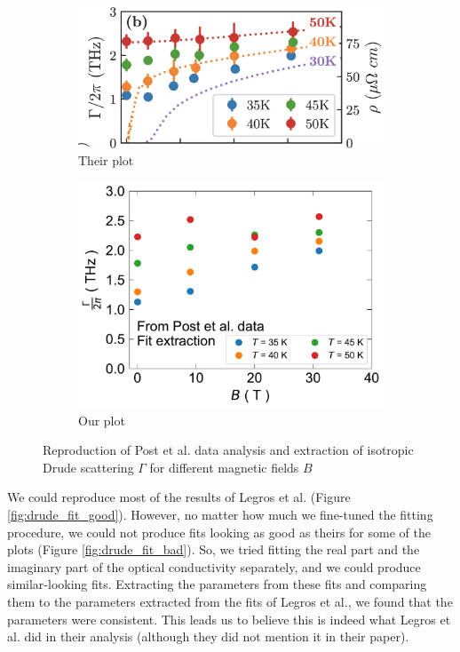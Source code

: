 \begin{figure}
\centering
\begin{subfigure}{0.45\textwidth}
    \includegraphics[width=\textwidth]{figures/gamma_theirs}
    \caption{Their plot}
    \label{fig:gamma_ours}
\end{subfigure}
\hfill
\begin{subfigure}{0.45\textwidth}
    \includegraphics[width=\textwidth]{figures/fitting_Drude_extracted_Gamma.pdf}
    \caption{Our plot}
    \label{fig:gamma_theirs}
\end{subfigure}
        
\caption{Reproduction of Post et al. data analysis and extraction of isotropic Drude scattering $\Gamma$ for different magnetic fields $B$}
\label{fig:reproduction_post}
\end{figure}

We could reproduce most of the results of Legros et al. (Figure \ref{fig:drude_fit_good}).
However, no matter how much we fine-tuned the fitting procedure, we could not produce fits looking
as good as theirs for some of the plots (Figure \ref{fig:drude_fit_bad}). So, we tried fitting the
real part and the imaginary part of the optical conductivity separately, and we could produce
similar-looking fits. Extracting the parameters from these fits and comparing them to the parameters
extracted from the fits of Legros et al., we found that the parameters were consistent. This leads
us to believe this is indeed what Legros et al. did in their analysis (although they did not mention
it in their paper).

